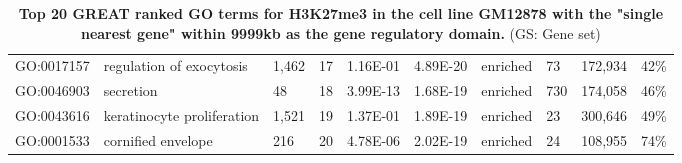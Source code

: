 \begin{sidewaystable}[!ht]
\begin{tabular}{lp{2cm}p{1cm}p{1cm}p{1.25cm}p{1.25cm}p{1cm}p{1.25cm}p{1.25cm}p{1.25cm}}
GO:0017157     & regulation of exocytosis                                  & 1,462                      & 17                  & 1.16E-01                      & 4.89E-20               & enriched        & 73                   & 172,934                & 42\%                     \\
GO:0046903     & secretion                                                 & 48                         & 18                  & 3.99E-13                      & 1.68E-19               & enriched        & 730                  & 174,058                & 46\%                     \\
GO:0043616     & keratinocyte proliferation                                & 1,521                      & 19                  & 1.37E-01                      & 1.89E-19               & enriched        & 23                   & 300,646                & 49\%                     \\
GO:0001533     & cornified envelope                                        & 216                        & 20                  & 4.78E-06                      & 2.02E-19               & enriched        & 24                   & 108,955                & 74\%
\end{tabular}
\normalsize
\caption[Top 20 GREAT ranked GO terms for H3K27me3 in the cell line GM12878 with the "single nearest gene" within 9999kb as the gene regulatory domain.]
{
\textbf{Top 20 GREAT ranked GO terms for H3K27me3 in the cell line GM12878 with the "single nearest gene" within 9999kb as the gene regulatory domain.}
(GS: Gene set)
}
\label{chap2:table:10}

\end{sidewaystable}
